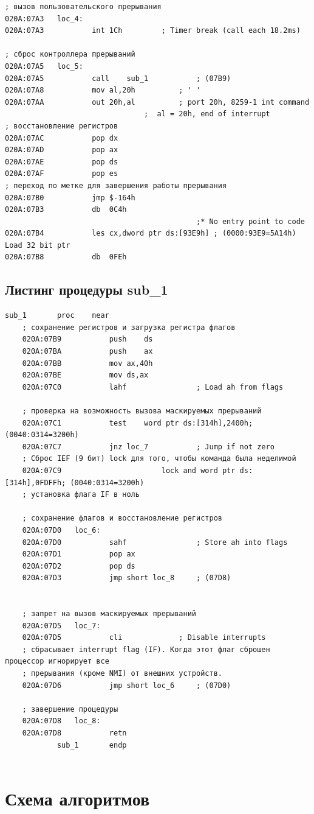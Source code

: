 \documentclass[a4paper,14pt]{article}
\begin{document}
\begin{lstlisting}[style={asm}]
; вызов пользовательского прерывания
020A:07A3	loc_4:
020A:07A3			int	1Ch			; Timer break (call each 18.2ms)

; сброс контроллера прерываний
020A:07A5	loc_5:
020A:07A5			call	sub_1			; (07B9)
020A:07A8			mov	al,20h			; ' '
020A:07AA			out	20h,al			; port 20h, 8259-1 int command
								;  al = 20h, end of interrupt
; восстановление регистров
020A:07AC			pop	dx
020A:07AD			pop	ax
020A:07AE			pop	ds
020A:07AF			pop	es
; переход по метке для завершения работы прерывания
020A:07B0			jmp	$-164h
020A:07B3			db	0C4h
					                        ;* No entry point to code
020A:07B4			les	cx,dword ptr ds:[93E9h]	; (0000:93E9=5A14h) Load 32 bit ptr
020A:07B8			db	0FEh

\end{lstlisting}

\clearpage
\subsection{Листинг процедуры sub\_1}

\begin{lstlisting}[style={asm}]
	sub_1		proc	near
	; сохранение регистров и загрузка регистра флагов
	020A:07B9			push	ds
	020A:07BA			push	ax
	020A:07BB			mov	ax,40h
	020A:07BE			mov	ds,ax
	020A:07C0			lahf				; Load ah from flags
	
	; проверка на возможность вызова маскируемых прерываний
	020A:07C1			test	word ptr ds:[314h],2400h; (0040:0314=3200h)
	020A:07C7			jnz	loc_7			; Jump if not zero
	; Сброс IEF (9 бит) lock для того, чтобы команда была неделимой
	020A:07C9	                    lock and word ptr ds:[314h],0FDFFh; (0040:0314=3200h)
	; установка флага IF в ноль
	
	; сохранение флагов и восстановление регистров
	020A:07D0	loc_6:
	020A:07D0			sahf				; Store ah into flags
	020A:07D1			pop	ax
	020A:07D2			pop	ds
	020A:07D3			jmp	short loc_8		; (07D8)
	
	
	; запрет на вызов маскируемых прерываний
	020A:07D5	loc_7:
	020A:07D5			cli				; Disable interrupts
	; сбрасывает interrupt flag (IF). Когда этот флаг сброшен процессор игнорирует все  
	; прерывания (кроме NMI) от внешних устройств.
	020A:07D6			jmp	short loc_6		; (07D0)
	
	; завершение процедуры
	020A:07D8	loc_8:
	020A:07D8			retn
			sub_1		endp
	
\end{lstlisting}
\clearpage

\section{Схема алгоритмов}
\end{document}
